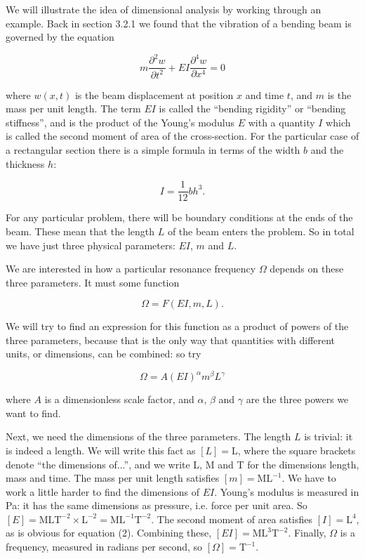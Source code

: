   We will illustrate the idea of dimensional analysis by working through an 
  example. Back in section 3.2.1 we found that the vibration of a bending beam 
  is governed by the equation 

  $$m \dfrac{\partial^2 w}{\partial t^2}+EI \dfrac{\partial^4 w}{\partial 
  x^4}=0 \tag{1}$$ 

  where $w(x,t)$ is the beam displacement at position $x$ and time $t$, and $m$ 
  is the mass per unit length. The term $EI$ is called the ``bending rigidity'' 
  or ``bending stiffness'', and is the product of the Young's modulus $E$ with 
  a quantity $I$ which is called the second moment of area of the 
  cross-section. For the particular case of a rectangular section there is a 
  simple formula in terms of the width $b$ and the thickness $h$: 

  $$I=\dfrac{1}{12} bh^3. \tag{2}$$ 

  For any particular problem, there will be boundary conditions at the ends of 
  the beam. These mean that the length $L$ of the beam enters the problem. So 
  in total we have just three physical parameters: $EI$, $m$ and $L$. 

  We are interested in how a particular resonance frequency $\Omega$ depends on 
  these three parameters. It must some function 

  $$\Omega = F(EI,m,L) . \tag{3}$$ 

  We will try to find an expression for this function as a product of powers of 
  the three parameters, because that is the only way that quantities with 
  different units, or dimensions, can be combined: so try 

  $$\Omega=A (EI)^\alpha m^\beta L^\gamma \tag{4}$$ 

  where $A$ is a dimensionless scale factor, and $\alpha$, $\beta$ and $\gamma$ 
  are the three powers we want to find. 

  Next, we need the dimensions of the three parameters. The length $L$ is 
  trivial: it is indeed a length. We will write this fact as $[L] = 
  \mathrm{L}$, where the square brackets denote ``the dimensions of...'', and 
  we write L, M and T for the dimensions length, mass and time. The mass per 
  unit length satisfies $[m] = \mathrm{M} \mathrm{L}^{-1}$. We have to work a 
  little harder to find the dimensions of $EI$. Young's modulus is measured in 
  Pa: it has the same dimensions as pressure, i.e. force per unit area. So $[E] 
  = \mathrm{M} \mathrm{L} \mathrm{T}^{-2} \times \mathrm{L}^{-2} = \mathrm{M} 
  \mathrm{L}^{-1} \mathrm{T}^{-2}$. The second moment of area satisfies $[I] = 
  \mathrm{L}^4$, as is obvious for equation (2). Combining these, $[EI] = 
  \mathrm{M} \mathrm{L}^3 \mathrm{T}^{-2}$. Finally, $\Omega$ is a frequency, 
  measured in radians per second, so $[\Omega] = \mathrm{T}^{-1}$. 


